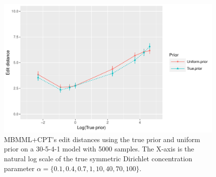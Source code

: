 \documentclass{svmult}
\begin{document}
\begin{figure}[hbt]
  \centering
    \includegraphics[scale=0.6]{figures/ed_vs_trueprior_30_5_4_alpha_134445_5000.pdf}
  \caption{MBMML+CPT's edit distances using the true prior and uniform prior on a 30-5-4-1 model with 5000 samples. The X-axis is the natural log scale of the true symmetric Dirichlet concentration parameter $\alpha = \{0.1, 0.4, 0.7, 1, 10, 40, 70, 100\}$.}
  \label{fg:wrong_prior_5000}
\end{figure}
\end{document}
